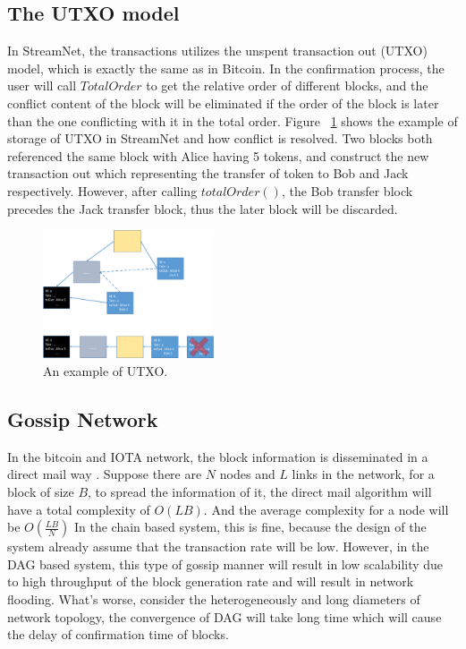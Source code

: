 \subsection{The UTXO model}

In StreamNet, the transactions utilizes the unspent transaction out (UTXO) model, which is exactly the same as in Bitcoin.
In the confirmation process, the user will call $TotalOrder$ to get the relative order of different blocks, 
and the conflict content of the block will be eliminated if the order of the block is later than the one conflicting with it in the total order.
Figure ~\ref{utxo} shows the example of storage of UTXO in StreamNet and how conflict is resolved.
Two blocks both referenced the same block with Alice having 5 tokens, and construct the new transaction out which representing the transfer of token to Bob and Jack respectively.
However, after calling $totalOrder()$, the Bob transfer block precedes the Jack transfer block, thus the later block will be discarded.

\begin{figure}[!ht]
\begin{center}
\includegraphics[width=0.45\textwidth]{figures/utxo.pdf}
    \caption{
        An example of UTXO.
     }
\label{utxo}
\end{center}
\end{figure}

\subsection{Gossip Network}
In the bitcoin and IOTA network, the block information is disseminated in a direct mail way \cite{demers1988epidemic}.
Suppose there are $N$ nodes and $L$ links in the network, for a block of size $B$,
to spread the information of it, the direct mail algorithm will have a total complexity of $O(LB)$.
And the average complexity for a node will be $O(\frac{LB}{N})$
In the chain based system, this is fine, because the design of the system already assume that the transaction rate will be low.
However, in the DAG based system, this type of gossip manner will result in 
low scalability due to high throughput of the block generation rate and will result in network flooding.
What's worse, consider the heterogeneously and long diameters of network topology, 
the convergence of DAG will take long time which will cause the delay of confirmation time of blocks.

